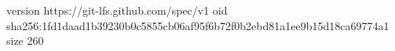 version https://git-lfs.github.com/spec/v1
oid sha256:1fd1daad1b39230b0c5855cb06af95f6b72f0b2ebd81a1ee9b15d18ca69774a1
size 260
